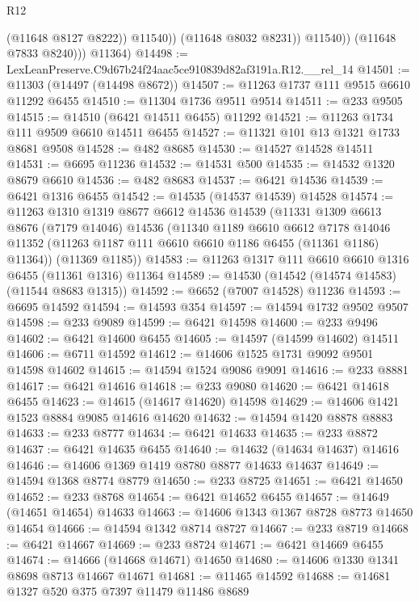 \begin{lexlean}{R12}
\begin{coremodule}
                      (@11648 @8127 @8222))
                    @11540))
                (@11648 @8032 @8231))
              @11540))
          (@11648 @7833 @8240)))
      @11364)
@14498 := LexLeanPreserve.C9d67b24f24aac5ce910839d82af3191a.R12.__rel_14
@14501 := @11303 (@14497 (@14498 @8672))
@14507 := @11263 @1737 @111 @9515 @6610 @11292 @6455
@14510 := @11304 @1736 @9511 @9514
@14511 := @233 @9505
@14515 := @14510 (@6421 @14511 @6455) @11292
@14521 := @11263 @1734 @111 @9509 @6610 @14511 @6455
@14527 := @11321 @101 @13 @1321 @1733 @8681 @9508
@14528 := @482 @8685
@14530 := @14527 @14528 @14511
@14531 := @6695 @11236
@14532 := @14531 @500
@14535 := @14532 @1320 @8679 @6610
@14536 := @482 @8683
@14537 := @6421 @14536
@14539 := @6421 @1316 @6455
@14542 := @14535 (@14537 @14539) @14528
@14574 := @11263
    @1310
    @1319
    @8677
    @6612
    @14536
    @14539
    (@11331
      @1309
      @6613
      @8676
      (@7179 @14046)
      @14536
      (@11340
        @1189
        @6610
        @6612
        @7178
        @14046
        @11352
        (@11263 @1187 @111 @6610 @6610 @1186 @6455 (@11361 @1186) @11364))
      (@11369 @1185))
@14583 := @11263 @1317 @111 @6610 @6610 @1316 @6455 (@11361 @1316) @11364
@14589 := @14530 (@14542 (@14574 @14583) (@11544 @8683 @1315))
@14592 := @6652 (@7007 @14528) @11236
@14593 := @6695 @14592
@14594 := @14593 @354
@14597 := @14594 @1732 @9502 @9507
@14598 := @233 @9089
@14599 := @6421 @14598
@14600 := @233 @9496
@14602 := @6421 @14600 @6455
@14605 := @14597 (@14599 @14602) @14511
@14606 := @6711 @14592
@14612 := @14606 @1525 @1731 @9092 @9501 @14598 @14602
@14615 := @14594 @1524 @9086 @9091
@14616 := @233 @8881
@14617 := @6421 @14616
@14618 := @233 @9080
@14620 := @6421 @14618 @6455
@14623 := @14615 (@14617 @14620) @14598
@14629 := @14606 @1421 @1523 @8884 @9085 @14616 @14620
@14632 := @14594 @1420 @8878 @8883
@14633 := @233 @8777
@14634 := @6421 @14633
@14635 := @233 @8872
@14637 := @6421 @14635 @6455
@14640 := @14632 (@14634 @14637) @14616
@14646 := @14606 @1369 @1419 @8780 @8877 @14633 @14637
@14649 := @14594 @1368 @8774 @8779
@14650 := @233 @8725
@14651 := @6421 @14650
@14652 := @233 @8768
@14654 := @6421 @14652 @6455
@14657 := @14649 (@14651 @14654) @14633
@14663 := @14606 @1343 @1367 @8728 @8773 @14650 @14654
@14666 := @14594 @1342 @8714 @8727
@14667 := @233 @8719
@14668 := @6421 @14667
@14669 := @233 @8724
@14671 := @6421 @14669 @6455
@14674 := @14666 (@14668 @14671) @14650
@14680 := @14606 @1330 @1341 @8698 @8713 @14667 @14671
@14681 := @11465 @14592
@14688 := @14681 @1327 @520 @375 @7397 @11479 @11486 @8689

\end{coremodule}
\end{lexlean}
